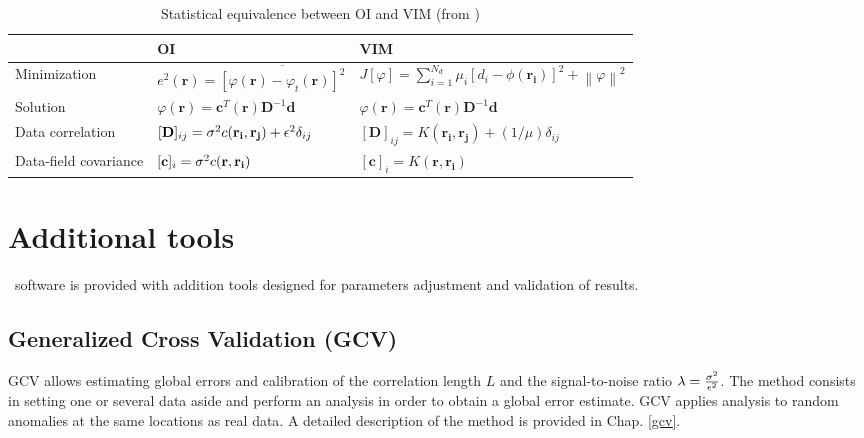 \begin{table}[H]
\begin{flushleft}
\caption{Statistical equivalence between OI and VIM (from \cite{RIXEN00})\label{tabOAVIM}}
\begin{tabular}{lll}
\hline
											&		OI																																										  	&VIM \\
											\hline
Minimization \rule{0pt}{3ex}& $e^{2}(\mathbf{r})= \overline{ [\varphi(\mathbf{r})-\varphi_{t}(\mathbf{r})]^{2}}$					& $J[\varphi]=\sum_{i=1}^{N_d}\mu_{i}[d_{i}-\phi(\mathbf{r_{i}})]^{2}+\left\|\varphi\right\|^{2}$\\
Solution							& $\varphi(\mathbf{r})= \mathbf{c}^{T}(\mathbf{r})\mathbf{D}^{-1}\mathbf{d}$								& $\varphi(\mathbf{r})= \mathbf{c}^{T}(\mathbf{r})\mathbf{D}^{-1}\mathbf{d}$	\\
Data correlation			& $[\mathbf{D}]_{ij}=\sigma^{2} c(\mathbf{r_{i}},\mathbf{r_{j}})+\epsilon^{2}\delta_{ij}$	& $[\mathbf{D}]_{ij}=K(\mathbf{r_i},\mathbf{r_j})+(1/\mu)\delta_{ij}$\\
Data-field covariance & $[\mathbf{c}]_{i}=\sigma^{2} c(\mathbf{r},\mathbf{r_{i}})$																						& $[\mathbf{c}]_{i}=K(\mathbf{r},\mathbf{r_{i}})$	\\
\hline
\end{tabular}
\end{flushleft}
\end{table}


 
 
 
 
 
 
 

\section{Additional tools}

\diva\, software is provided with addition tools designed for parameters adjustment and validation of results.


\subsection{Generalized Cross Validation (GCV)\label{firsttool}}

GCV allows estimating global errors and calibration of the correlation length $L$ and the signal-to-noise ratio $\lambda=\frac{\sigma^{2}}{\epsilon^{2}}$.
The method consists in setting one or several data aside and perform an analysis in order to obtain a global error estimate. GCV applies analysis to random anomalies at the same locations as real data. A detailed description of the method is provided in Chap. \ref{gcv}.


